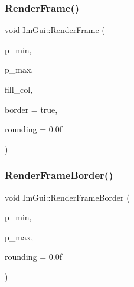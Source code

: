 \hypertarget{namespace_im_gui_a621ba649568ede3939d4f10d83b86d04}{}\label{namespace_im_gui_a621ba649568ede3939d4f10d83b86d04} 
\subsubsection{\texorpdfstring{Render\+Frame()}{RenderFrame()}}
{\footnotesize\ttfamily void Im\+Gui\+::\+Render\+Frame (\begin{DoxyParamCaption}\item[{\hyperlink{struct_im_vec2}{Im\+Vec2}}]{p\+\_\+min,  }\item[{\hyperlink{struct_im_vec2}{Im\+Vec2}}]{p\+\_\+max,  }\item[{Im\+U32}]{fill\+\_\+col,  }\item[{bool}]{border = {\ttfamily true},  }\item[{float}]{rounding = {\ttfamily 0.0f} }\end{DoxyParamCaption})}

\hypertarget{namespace_im_gui_adc76239c2006e66f8dab7638529a763d}{}\label{namespace_im_gui_adc76239c2006e66f8dab7638529a763d} 
\subsubsection{\texorpdfstring{Render\+Frame\+Border()}{RenderFrameBorder()}}
{\footnotesize\ttfamily void Im\+Gui\+::\+Render\+Frame\+Border (\begin{DoxyParamCaption}\item[{\hyperlink{struct_im_vec2}{Im\+Vec2}}]{p\+\_\+min,  }\item[{\hyperlink{struct_im_vec2}{Im\+Vec2}}]{p\+\_\+max,  }\item[{float}]{rounding = {\ttfamily 0.0f} }\end{DoxyParamCaption})}

\hypertarget{namespace_im_gui_af311762331bda4508b25e05f6afc7f45}{}\label{namespace_im_gui_af311762331bda4508b25e05f6afc7f45} 

